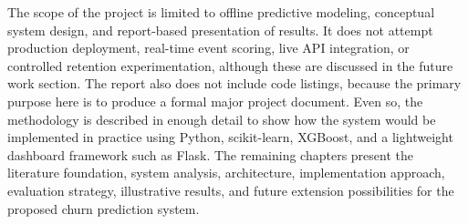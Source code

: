The scope of the project is limited to offline predictive modeling, conceptual system design, and report-based presentation of results. It does not attempt production deployment, real-time event scoring, live API integration, or controlled retention experimentation, although these are discussed in the future work section. The report also does not include code listings, because the primary purpose here is to produce a formal major project document. Even so, the methodology is described in enough detail to show how the system would be implemented in practice using Python, scikit-learn, XGBoost, and a lightweight dashboard framework such as Flask. The remaining chapters present the literature foundation, system analysis, architecture, implementation approach, evaluation strategy, illustrative results, and future extension possibilities for the proposed churn prediction system.
